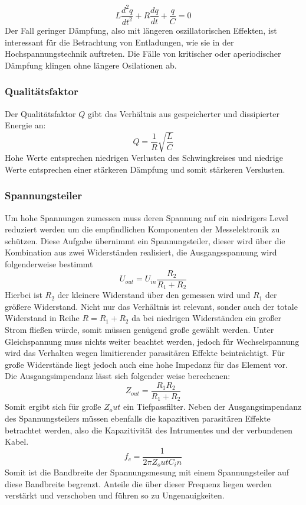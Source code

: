 \begin{equation}
L\frac{d^2q}{dt^2} + R\frac{dq}{dt} + \frac{q}{C} = 0
\end{equation}
Der Fall geringer Dämpfung, also mit längeren oszillatorischen Effekten, ist interessant für die Betrachtung von Entladungen, wie sie in der Hochspannungstechnik auftreten. Die Fälle von kritischer oder aperiodischer Dämpfung klingen ohne längere Osilationen ab.
\subsubsection{Qualitätsfaktor}
Der Qualitätsfaktor \(Q\) gibt das Verhältnis aus gespeicherter und dissipierter Energie an:
\begin{equation}
Q = \frac{1}{R} \sqrt{\frac{L}{C}}
\end{equation}
Hohe Werte entsprechen niedrigen Verlusten des Schwingkreises und niedrige Werte entsprechen einer stärkeren Dämpfung und somit stärkeren Verslusten.

\subsubsection{Spannungsteiler}
\label{sec:voltagedividertheo}
Um hohe Spannungen zumessen muss deren Spannung auf ein niedrigers Level reduziert werden um die empfindlichen Komponenten der Messelektronik zu schützen. Diese Aufgabe übernimmt ein Spannungsteiler, dieser wird über die Kombination aus zwei Widerständen realisiert, die Ausgangsspannung wird folgenderweise bestimmt
\begin{equation}
    U_{out} = U_{in} \frac{R_2}{R_1 + R_2}
    \label{eq:voltagedivider}
\end{equation}
Hierbei ist \(R_2\) der kleinere Widerstand über den gemessen wird und \(R_1\) der größere Widerstand. Nicht nur das Verhältnis ist relevant, sonder auch der totale Widerstand in Reihe \(R = R_1 + R_2\) da bei niedrigen Widerständen ein großer Strom fließen würde, somit müssen genügend große gewählt werden. Unter Gleichspannung muss nichts weiter beachtet werden, jedoch für Wechselspannung wird das Verhalten wegen limitierender parasitären Effekte beinträchtigt. Für große Widerstände liegt jedoch auch eine hohe Impedanz für das Element vor. Die Ausgangsimpendanz lässt sich folgender weise berechenen:
\begin{equation}
    Z_{out} = \frac{R_1 R_2}{R_1 + R_2}
    \label{eq:voltagedividerimp}
\end{equation}
Somit ergibt sich für große \(Z_out\) ein Tiefpassfilter. Neben der Ausgangsimpendanz des Spannungsteilers müssen ebenfalls die kapazitiven parasitären Effekte betrachtet werden, also die Kapazitivität des Intrumentes und der verbundenen Kabel.
\begin{equation}
    f_c = \frac{1}{2\pi Z_out C_in}
    \label{eq: voltagedividerfreq}
\end{equation}
Somit ist die Bandbreite der Spannungsmesung mit einem Spannungsteiler auf diese Bandbreite begrenzt. Anteile die über dieser Frequenz liegen werden verstärkt und verschoben und führen so zu Ungenauigkeiten. 

